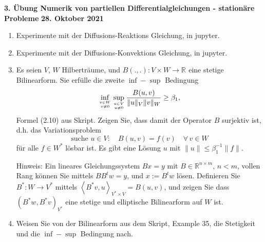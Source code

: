 \documentclass[11pt,a4paper]{report}
\newcommand{\R}[1]{\mathbb{R}^{#1}}
\begin{document}
\begin{center}
\textbf{3. \"Ubung Numerik von partiellen Differentialgleichungen - station\"are Probleme} \newline 
\textbf{28. Oktober 2021}
\end{center}

\setcounter{enumi}{4}

\begin{enumerate}

\item Experimente mit  der Diffusions-Reaktions Gleichung, in jupyter.

\item Experimente mit der Diffusions-Konvektions Gleichung, in jupyter.


\item Es seien $V$, $W$ Hilbertr\"aume,  und $B(.,.) : V \times W
  \rightarrow \R{}$ eine stetige Bilinearform. Sie erf\"ulle die zweite $\inf-\sup$ Bedingung 
$$
\inf_{v \in W \atop v \neq 0} \sup_{u \in V \atop u \neq 0} \frac{B(u,v)}{\|u\|_V \| v\|_W} \geq \beta_1,
$$
Formel (2.10) aus Skript. Zeigen Sie, dass damit der Operator $B$
surjektiv ist, d.h. das Variationsproblem
$$
\text{suche } u \in V: \quad B(u,v) = f(v) \quad \forall \, v \in W
$$
 f\"ur alle $f \in W^\ast$ l\"osbar ist. Es gibt eine L\"osung $u$
 mit $\|u \| \leq \beta_1^{-1} \| f\|$.  

Hinweis: Ein lineares Gleichungssystem $B x = y$ mit $B \in \R{n
  \times m}$, $n < m$, vollen Rang k\"onnen Sie mittels 
$B B^t w = y$, und $x := B^t w$ l\"osen. Definieren Sie $B^\ast : W
\rightarrow V^\ast$ mittels $\left<B^\ast v, u\right>_{V^\ast \times V} =
B(u,v)$, und zeigen Sie dass $(B^\ast w, B^\ast v)_{V^\ast}$ eine stetige und
elliptische Bilinearform auf $W$ ist.



\item Weisen Sie von der Bilinearform aus dem Skript, Example 35, die
  Stetigkeit und die $\inf-\sup$ Bedingung nach.

\end{enumerate}
\end{document}
